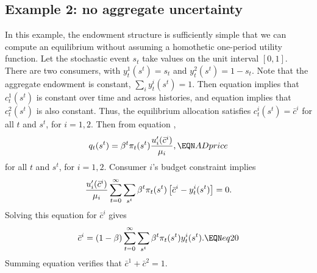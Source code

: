 \subsection{Example 2: no aggregate uncertainty}\label{sec:example2GG}%
In this example, the endowment structure is sufficiently simple that we can compute an equilibrium without assuming a homothetic
one-period utility function. Let the stochastic event $s_t$ take values on the unit interval
$[0,1]$.  There are two consumers, with $ y_t^1(s^t) =s_t$ and
$y_t^2(s^t) =1-s_t$.  Note that the aggregate endowment is
constant, $\sum_i y_t^i(s^t) =1$.  Then equation  implies
that $c_t^1(s^t)$ is constant over time and across histories, and
equation  implies that $c_t^2(s^t)$ is also constant.
Thus, the equilibrium allocation satisfies
$c_t^i(s^t) = \bar c^i$ for all $t$ and $s^t$, for $i=1,2$.  Then
from equation ,
$$ q_t(s^t) = \beta^t \pi_t(s^t) {u'_i(\bar c^i) \over \mu_i}, \EQN ADprice $$
for all $t$ and $s^t$, for $i=1,2$.  Consumer $i$'s budget constraint
implies
 $$ {u'_i(\bar c^i) \over \mu_i} \sum_{t=0}^\infty \sum_{s^t} \beta^t \pi_t(s^t)
\left[\bar c^i - y_t^i(s^t)\right] = 0 .$$ Solving this equation
for $\bar c^i$ gives
$$ \bar c^i =( 1 -\beta) \sum_{t=0}^\infty \sum_{s^t} \beta^t \pi_t(s^t) y_t^i(s^t) .
      \EQN eq20 $$
Summing equation   verifies that $\bar c^1 + \bar c^2
=1$.


